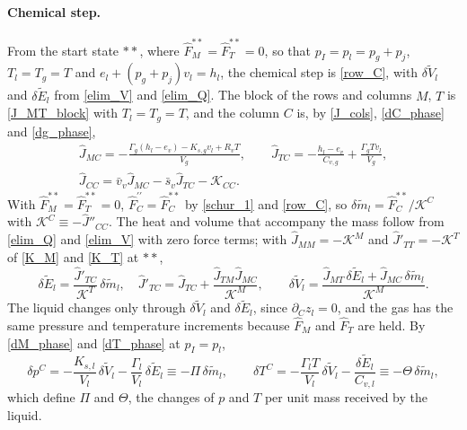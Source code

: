 \paragraph{Chemical step.}
From the start state $**$, where $\hat{F}_M^{**}=\hat{F}_T^{**}=0$, so that $p_I=p_l=p_g+p_{j}$, $T_l=T_g=T$ and $e_l+(p_g+p_{j})v_l=h_l$, the chemical step is \eqref{row_C}, with $\delta\tilde{V}_l$ and $\delta\tilde{E}_l$ from \eqref{elim_V} and \eqref{elim_Q}. The block of the rows and columns $M$, $T$ is \eqref{J_MT_block} with $T_l=T_g=T$, and the column $C$ is, by \eqref{J_cols}, \eqref{dC_phase} and \eqref{dg_phase},
\begin{equation}\label{J_colC}
\begin{gathered}
\hat{J}_{MC}=-\frac{\Gamma_g(h_l-e_v)-K_{s,g}v_l+R_vT}{V_g},\qquad
\hat{J}_{TC}=-\frac{h_l-e_v}{C_{v,g}}+\frac{\Gamma_gTv_l}{V_g},\\
\hat{J}_{CC}=\bar v_v\hat{J}_{MC}-\bar s_v\hat{J}_{TC}-\mathcal{K}_{CC}.
\end{gathered}
\end{equation}
With $\hat{F}_M^{**}=\hat{F}_T^{**}=0$, $\hat{F}^{\prime\prime}_C=\hat{F}_C^{**}$ by \eqref{schur_1} and \eqref{row_C}, so $\delta\tilde{m}_l=\hat{F}_C^{**}/\mathcal{K}^C$ with $\mathcal{K}^C\equiv-\hat{J}''_{CC}$. The heat and volume that accompany the mass follow from \eqref{elim_Q} and \eqref{elim_V} with zero force terms; with $\hat{J}_{MM}=-\mathcal{K}^M$ and $\hat{J}'_{TT}=-\mathcal{K}^T$ of \eqref{K_M} and \eqref{K_T} at $**$,
\begin{equation}\label{VE_C}
\delta\tilde{E}_l=\frac{\hat{J}'_{TC}}{\mathcal{K}^T}\,\delta\tilde{m}_l,\quad \hat{J}'_{TC}=\hat{J}_{TC}+\frac{\hat{J}_{TM}\hat{J}_{MC}}{\mathcal{K}^M},\qquad
\delta\tilde{V}_l=\frac{\hat{J}_{MT}\,\delta\tilde{E}_l+\hat{J}_{MC}\,\delta\tilde{m}_l}{\mathcal{K}^M}.
\end{equation}
The liquid changes only through $\delta\tilde{V}_l$ and $\delta\tilde{E}_l$, since $\partial_Cz_l=0$, and the gas has the same pressure and temperature increments because $\hat{F}_M$ and $\hat{F}_T$ are held. By \eqref{dM_phase} and \eqref{dT_phase} at $p_I=p_l$,
\begin{equation}\label{PiTh}
\delta p^C=-\frac{K_{s,l}}{V_l}\,\delta\tilde{V}_l-\frac{\Gamma_l}{V_l}\,\delta\tilde{E}_l\equiv-\Pi\,\delta\tilde{m}_l,\qquad
\delta T^C=-\frac{\Gamma_lT}{V_l}\,\delta\tilde{V}_l-\frac{\delta\tilde{E}_l}{C_{v,l}}\equiv-\Theta\,\delta\tilde{m}_l,
\end{equation}
which define $\Pi$ and $\Theta$, the changes of $p$ and $T$ per unit mass received by the liquid.

